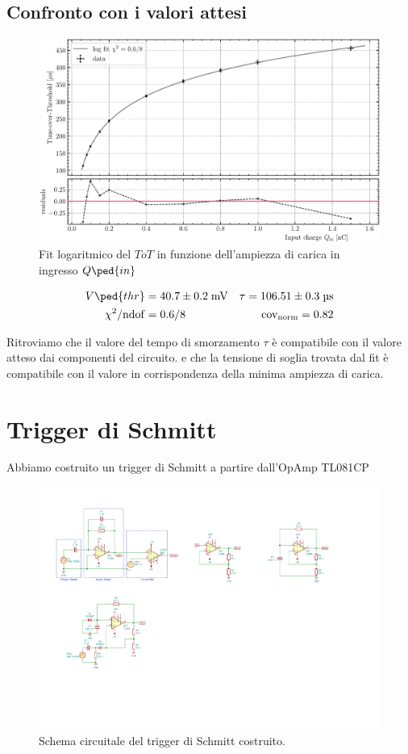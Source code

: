 \documentclass[10pt,a4paper]{article}
\begin{document}
\subsection{Confronto con i valori attesi}
\begin{figure}[htbp]
    \centering
	\includegraphics[scale=0.7]{logfit}
    \caption{Fit logaritmico del $ToT$ in funzione dell'ampiezza di carica in
    ingresso $Q\ped{in}$ \label{fig: logfit}}
\end{figure}
\begin{align*}
V\ped{thr} &= 40.7 \pm 0.2 \; \si{m\V}
&\tau = 106.51 \pm 0.3 \; \si{\micro\s} \\
\chi^2/\mathrm{ndof} &= 0.6/8 &\mathrm{cov_{norm}} = 0.82
\end{align*}

Ritroviamo che il valore del tempo di smorzamento $\tau$ è compatibile con il
valore atteso dai componenti del circuito.
e che la tensione di soglia trovata dal fit è compatibile con il valore
in corrispondenza della minima ampiezza di carica.
\section{Trigger di Schmitt}
Abbiamo costruito un trigger di Schmitt a partire dall'OpAmp TL081CP
\begin{figure}[htbp]
    \centering
	\includegraphics[scale=1.5]{trgSchmitt}
    \caption{Schema circuitale del trigger di Schmitt costruito.
    \label{fig: trgschmittschm}}
\end{figure}
\end{document}
